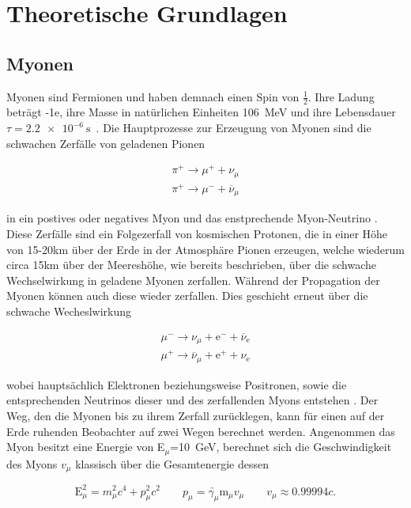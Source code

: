 \section{Theoretische Grundlagen}
    \subsection{Myonen}
        Myonen sind Fermionen und haben demnach einen Spin von $\frac{1}{2}$. Ihre Ladung beträgt -1e, ihre Masse in natürlichen Einheiten \SI{106}{\mega\electronvolt} und ihre Lebensdauer 
        $\tau = \SI{2.2e-6}{\second}$~\cite{zyla_review_2020}. Die Hauptprozesse zur Erzeugung von Myonen sind die schwachen Zerfälle von geladenen Pionen
        
        \begin{align*}
            \pi^+ \longrightarrow \mu^+ + \nu_{\mu} \\
            \pi^+ \longrightarrow \mu^- + \overline{\nu}_{\mu}
        \end{align*}

        in ein postives oder negatives Myon und das enstprechende Myon-Neutrino \cite{grupen_einstieg_2018}. Diese Zerfälle sind ein Folgezerfall von kosmischen Protonen, die in einer Höhe von 15-20km über der Erde in der Atmosphäre Pionen erzeugen, welche wiederum circa 15km über der Meereshöhe, wie bereits beschrieben, über die schwache Wechselwirkung in geladene Myonen zerfallen. Während der Propagation der Myonen können auch diese wieder zerfallen. Dies geschieht erneut über die schwache Wecheslwirkung 

        \begin{align*}
            \mu^- \longrightarrow \nu_{\mu} + \text{e}^- + \overline{\nu}_{\text{e}} \\
            \mu^+ \longrightarrow \overline{\nu}_{\mu} + \text{e}^+ + \nu_{\text{e}} 
        \end{align*}

        wobei hauptsächlich Elektronen beziehungsweise Positronen, sowie die entsprechenden Neutrinos dieser und des zerfallenden Myons entstehen \cite{grupen_einstieg_2018}. Der Weg, den die Myonen bis zu ihrem Zerfall zurücklegen,
        kann für einen auf der Erde ruhenden Beobachter auf zwei Wegen berechnet werden. Angenommen das Myon besitzt eine Energie von E$_{\mu}$=\SI{10}{\giga\electronvolt}, berechnet sich die Geschwindigkeit des Myons
        $v_{\mu}$ klassisch über die Gesamtenergie dessen 

        \begin{equation*}
            \text{E}_{\mu}^2 = m_{\mu}^2c^4 + p_{\mu}^2c^2 \qquad \underrightarrow{p_{\mu}=\gamma_{\mu} \text{m}_{\mu}v_{\mu}} \qquad v_{\mu} \approx \num{0.99994}c .
        \end{equation*}

